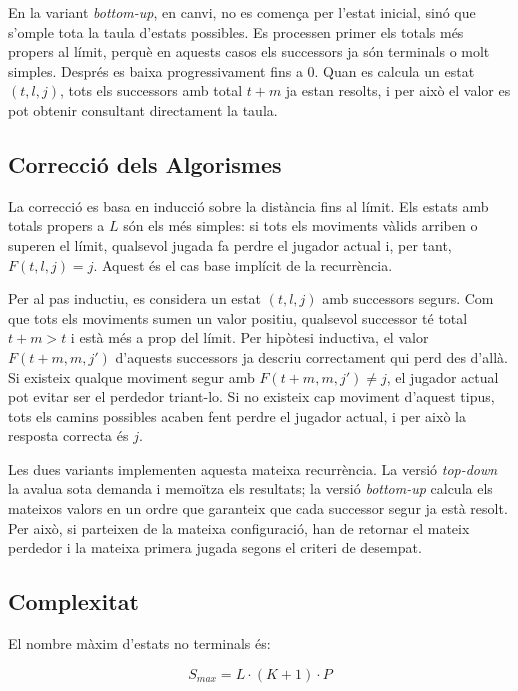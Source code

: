 \documentclass[conference,compsoc]{IEEEtran}
\begin{document}
En la variant \textit{bottom-up}, en canvi, no es comença per l'estat inicial,
sinó que s'omple tota la taula d'estats possibles. Es processen primer els totals
més propers al límit, perquè en aquests casos els successors ja són terminals o
molt simples. Després es baixa progressivament fins a $0$. Quan es calcula un
estat $(t,l,j)$, tots els successors amb total $t+m$ ja estan resolts, i per això
el valor es pot obtenir consultant directament la taula.

\subsection{Correcció dels Algorismes}

La correcció es basa en inducció sobre la distància fins al límit. Els estats amb
totals propers a $L$ són els més simples: si tots els moviments vàlids arriben o
superen el límit, qualsevol jugada fa perdre el jugador actual i, per tant,
$F(t,l,j)=j$. Aquest és el cas base implícit de la recurrència.

Per al pas inductiu, es considera un estat $(t,l,j)$ amb successors segurs. Com
que tots els moviments sumen un valor positiu, qualsevol successor té total
$t+m>t$ i està més a prop del límit. Per hipòtesi inductiva, el valor
$F(t+m,m,j')$ d'aquests successors ja descriu correctament qui perd des d'allà.
Si existeix qualque moviment segur amb $F(t+m,m,j')\neq j$, el jugador actual pot
evitar ser el perdedor triant-lo. Si no existeix cap moviment d'aquest tipus,
tots els camins possibles acaben fent perdre el jugador actual, i per això la
resposta correcta és $j$.

Les dues variants implementen aquesta mateixa recurrència. La versió
\textit{top-down} la avalua sota demanda i memoïtza els resultats; la versió
\textit{bottom-up} calcula els mateixos valors en un ordre que garanteix que cada
successor segur ja està resolt. Per això, si parteixen de la mateixa configuració,
han de retornar el mateix perdedor i la mateixa primera jugada segons el criteri
de desempat.

\subsection{Complexitat}

El nombre màxim d'estats no terminals és:

\begin{equation}
S_{max}=L\cdot(K+1)\cdot P
\label{eq:states}
\end{equation}
\end{document}
